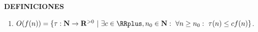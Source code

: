 
{\centering \textbf{DEFINICIONES}}

\begin{enumerate}
	\item $O(f(n)) = \{\tau : \NN \to \Rpos \ | \ 
		\exists c \in \RRplus, n_0 \in \NN : \ 
		\forall n \geq n_0 : \ \tau(n) \leq c f(n)\}$.
\end{enumerate}
